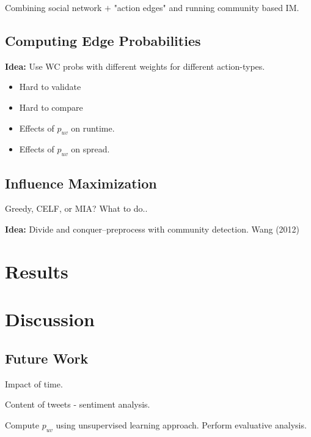 \documentclass[sigconf]{acmart}
\begin{document}
Combining social network $+$ "action edges" and running community based IM. 

\subsection{Computing Edge Probabilities}

\textbf{Idea:} Use WC probs with different weights for different action-types. 

\begin{itemize}

\item Hard to validate

\item Hard to compare

\item Effects of $p_{uv}$ on runtime. 

\item Effects of $p_{uv}$ on spread. 

\end{itemize}


\subsection{Influence Maximization}

Greedy, CELF, or MIA? What to do..

\textbf{Idea:} Divide and conquer--preprocess with community detection. Wang (2012)

\section{Results} 

\section{Discussion}

\subsection{Future Work}

Impact of time. 

Content of tweets - sentiment analysis. 

Compute $p_{uv}$ using unsupervised learning approach. Perform evaluative analysis. 

\nocite{*}


\end{document}
